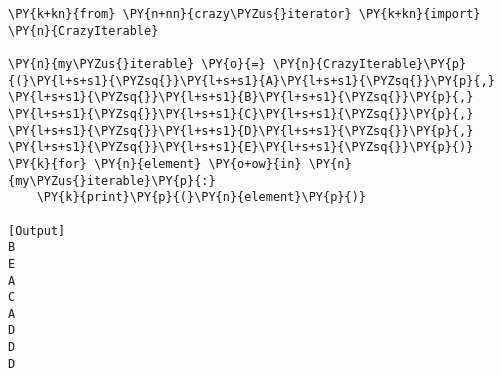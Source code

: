 \begin{Verbatim}[label=\makebox{\url{https://bitbucket.org/lbaldini/programming/src/tip/snippets/test\_crazy\_iterator.py}},commandchars=\\\{\}]
\PY{k+kn}{from} \PY{n+nn}{crazy\PYZus{}iterator} \PY{k+kn}{import} \PY{n}{CrazyIterable}
   
\PY{n}{my\PYZus{}iterable} \PY{o}{=} \PY{n}{CrazyIterable}\PY{p}{(}\PY{l+s+s1}{\PYZsq{}}\PY{l+s+s1}{A}\PY{l+s+s1}{\PYZsq{}}\PY{p}{,} \PY{l+s+s1}{\PYZsq{}}\PY{l+s+s1}{B}\PY{l+s+s1}{\PYZsq{}}\PY{p}{,} \PY{l+s+s1}{\PYZsq{}}\PY{l+s+s1}{C}\PY{l+s+s1}{\PYZsq{}}\PY{p}{,} \PY{l+s+s1}{\PYZsq{}}\PY{l+s+s1}{D}\PY{l+s+s1}{\PYZsq{}}\PY{p}{,} \PY{l+s+s1}{\PYZsq{}}\PY{l+s+s1}{E}\PY{l+s+s1}{\PYZsq{}}\PY{p}{)}
\PY{k}{for} \PY{n}{element} \PY{o+ow}{in} \PY{n}{my\PYZus{}iterable}\PY{p}{:}
    \PY{k}{print}\PY{p}{(}\PY{n}{element}\PY{p}{)}

[Output]
B
E
A
C
A
D
D
D
\end{Verbatim}